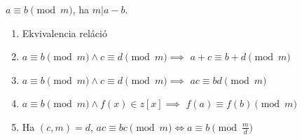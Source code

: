 \begin{frame}
\begin{tcolorbox}[title={Def.: Kanonikus alak, Módosított kanonikus alak}]
\end{tcolorbox}

\begin{tcolorbox}[title={Def.: Erathosztenész SZitája}]
\end{tcolorbox}
\end{frame}

\begin{frame}

\begin{tcolorbox}[title={Def.: Lineáris Kongruencia}]
$a \equiv b \pmod{m}$, ha $m | a - b$.
\end{tcolorbox}

\begin{tcolorbox}[title={Tétel: Kongruencia tulajdonságai}]
\begin{enumerate}
\item Ekvivalencia reláció
\item $a \equiv b \pmod{m} \land c \equiv d \pmod{m} \implies$ \textbf{$a + c \equiv b + d \pmod{m}$}
\item $a \equiv b \pmod{m} \land c \equiv d \pmod{m} \implies$ \textbf{$ac \equiv bd \pmod{m}$}
\item $a \equiv b \pmod{m} \land f(x) \in z[x] \implies$ \textbf{$f(a) \equiv f(b) \pmod{m}$}
\item Ha $(c, m) = d$, $ac \equiv bc \pmod{m} \iff a \equiv b \pmod{\frac{m}{d}}$
\end{enumerate}
\end{tcolorbox}

\begin{tcolorbox}[title={Ész}]
\end{tcolorbox}
\end{frame}

\begin{frame}
\begin{tcolorbox}[title={Def.: Az Euler-féle $\phi$ függvény}]
\end{tcolorbox}

\begin{tcolorbox}[title={Def.: A $\tau$ függvény}]
\end{tcolorbox}
\end{frame}

\begin{frame}
\begin{tcolorbox}[title={Def.: TMR, RMR}]
\end{tcolorbox}
\end{frame}

